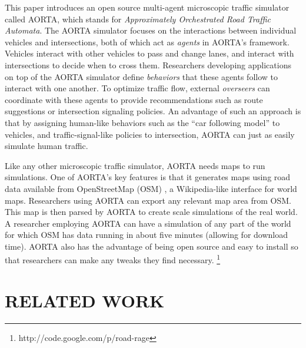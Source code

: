 \documentclass[letterpaper, 10 pt, conference]{ieeeconf}  %
\begin{document}

This paper introduces an open source multi-agent microscopic traffic
simulator called AORTA, which stands for \textit{Approximately
Orchestrated Road Traffic Automata}. The AORTA simulator focuses on
the interactions between individual vehicles and intersections, both
of which act as \textit{agents} in AORTA's framework. Vehicles
interact with other vehicles to pass and change lanes, and interact
with intersections to decide when to cross them. Researchers
developing applications on top of the AORTA simulator define
\textit{behaviors} that these agents follow to interact with one
another. To optimize traffic flow, external \textit{overseers} can
coordinate with these agents to provide recommendations such as route
suggestions or intersection signaling policies.  An advantage of such
an approach is that by assigning human-like behaviors such as the
``car following model'' \cite{brackstone1999car} to vehicles, and
traffic-signal-like policies to intersection, AORTA can just as easily
simulate human traffic.

Like any other microscopic traffic simulator, AORTA needs maps to run
simulations. One of AORTA's key features is that it generates maps using road data available from OpenStreetMap
(OSM) \cite{osm}, a Wikipedia-like interface for world maps. Researchers using
AORTA can export any relevant map area from OSM. This map is then parsed by AORTA to
create scale simulations of the real world. A researcher employing AORTA can have a simulation
of any part of the world for which OSM has data running in about five minutes
(allowing for download time).  AORTA also has the advantage of being open source and
easy to install so that researchers can make any tweaks they find necessary.
\footnote{http://code.google.com/p/road-rage}




\section{RELATED WORK}
\label{sec:related_work}
\end{document}
